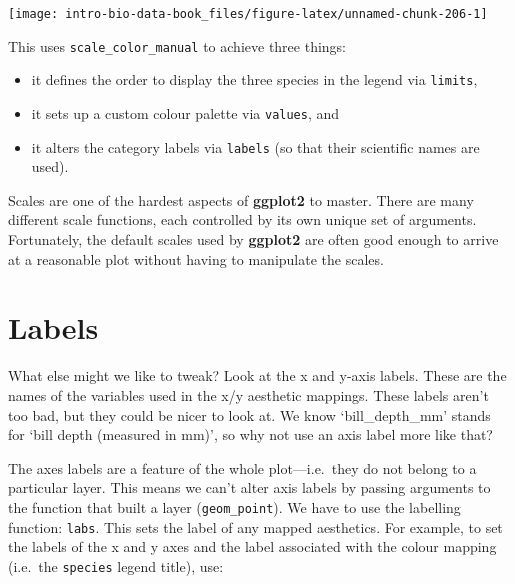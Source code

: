 \documentclass[
]{book}
\providecommand{\tightlist}{%
  \setlength{\itemsep}{0pt}\setlength{\parskip}{0pt}}
\begin{document}
\begin{center}\texttt{[image: intro-bio-data-book\_files/figure-latex/unnamed-chunk-206-1]} \end{center}

This uses \texttt{scale\_color\_manual} to achieve three things:

\begin{itemize}
\tightlist
\item
  it defines the order to display the three species in the legend via \texttt{limits},
\item
  it sets up a custom colour palette via \texttt{values}, and
\item
  it alters the category labels via \texttt{labels} (so that their scientific names are used).
\end{itemize}

Scales are one of the hardest aspects of \textbf{ggplot2} to master. There are many different scale functions, each controlled by its own unique set of arguments. Fortunately, the default scales used by \textbf{ggplot2} are often good enough to arrive at a reasonable plot without having to manipulate the scales.

\hypertarget{labels}{%
\section{Labels}\label{labels}}

What else might we like to tweak? Look at the x and y-axis labels. These are the names of the variables used in the x/y aesthetic mappings. These labels aren't too bad, but they could be nicer to look at. We know `bill\_depth\_mm' stands for `bill depth (measured in mm)', so why not use an axis label more like that?

The axes labels are a feature of the whole plot---i.e.~they do not belong to a particular layer. This means we can't alter axis labels by passing arguments to the function that built a layer (\texttt{geom\_point}). We have to use the labelling function: \texttt{labs}. This sets the label of any mapped aesthetics. For example, to set the labels of the x and y axes and the label associated with the colour mapping (i.e.~the \texttt{species} legend title), use:
\end{document}
